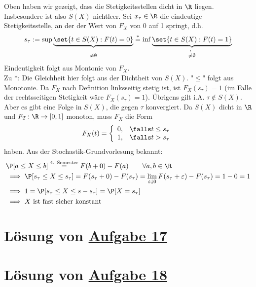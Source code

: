 Oben haben wir gezeigt, dass die Stetigkeitsstellen dicht in $\R$ liegen.
Insbesondere ist also $S(X)$ nichtleer.
Sei $x_\tau\in\R$ die eindeutige Stetigkeitsstelle, an der der Wert von $F_X$ von 0 auf 1 springt, d.h.
\begin{align*}
	s_\tau:=\sup\underbrace{\set{t\in S(X):F(t)=0}}_{
		\overset{!}{\neq}\emptyset
	}
	\overset{\ast}{=}
	\inf\underbrace{\set{t\in S(X):F(t)=1}}_{
		\overset{!}{\neq}\emptyset
	}
\end{align*}
Eindeutigkeit folgt aus Montonie von $F_X$.\\
Zu $\ast$: Die Gleichheit hier folgt aus der Dichtheit von $S(X)$.
"$\leq$" folgt aus Monotonie.
Da $F_X$ nach Definition linksseitig stetig ist, ist $F_X(s_\tau)=1$ (im Falle der rechtsseitigen Stetigkeit wäre $F_X(s_\tau)=1$).
Übrigens gilt i.A. $\tau\not\in S(X)$.
Aber es gibt eine Folge in $S(X)$, die gegen $\tau$ konvergiert.
Da $S(X)$ dicht in $\R$ und $F_T\colon\R\to[0,1]$ monoton, muss $F_X$ die Form
\begin{align*}
	F_X(t)=\left\lbrace\begin{array}{cl}
		0, &\falls t\leq s_\tau\\
		1, &\falls t> s_\tau
	\end{array}\right.
\end{align*}
haben.
Aus der Stochastik-Grundvorlesung bekannt:
\begin{align*}
	&\P[a\leq X\leq b]
	\overset{\text{4. Semester}}{=}
	F(b+0)-F(a)\qquad\forall a,b\in\R\\
	&\implies
	\P[s_\tau\leq X\leq s_\tau]
	=
	F(s_\tau+0)-F(s_\tau)
	=\lim\limits_{\varepsilon\downarrow0} F(s_\tau+\varepsilon)-F(s_\tau)
	=1-0=1\\
	&\implies
	1=\P[s_\tau\leq X\leq s-s_\tau]=\P[X=s_\tau]\\
	&\implies
	X\text{ ist fast sicher konstant}
\end{align*}

\section{Lösung von 
	\texorpdfstring{\hyperref[aufg:17]{Aufgabe 17}}{}
}\label{loes:17}

\section{Lösung von 
	\texorpdfstring{\hyperref[aufg:18]{Aufgabe 18}}{}
}\label{loes:18}
